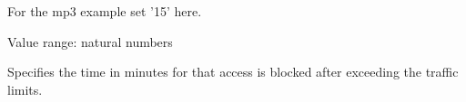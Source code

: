 \begin{description}
   For the mp3 example set '15' here.



   Value range: natural numbers

   Specifies the time in minutes for that access is blocked after exceeding the traffic limits.

\end{description}

